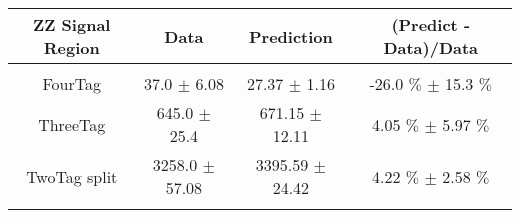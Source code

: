 \begin{footnotesize} 
\begin{tabular}{c|c|c|c} 
ZZ Signal Region & Data & Prediction & (Predict - Data)/Data \\ 
\hline\hline 
& & & \\ 
FourTag & 37.0 $\pm$ 6.08 & 27.37 $\pm$ 1.16 & -26.0 $\%$  $\pm$ 15.3 $\%$ \\ 
\hline 
ThreeTag & 645.0 $\pm$ 25.4 & 671.15 $\pm$ 12.11 & 4.05 $\%$  $\pm$ 5.97 $\%$ \\ 
\hline 
TwoTag split & 3258.0 $\pm$ 57.08 & 3395.59 $\pm$ 24.42 & 4.22 $\%$  $\pm$ 2.58 $\%$ \\ 
& & & \\ 
\hline\hline 
\end{tabular} 
\end{footnotesize} 
\newline 
